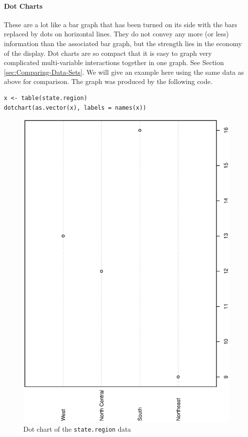 \documentclass[captions=tableheading]{scrbook}
\begin{document}
\paragraph*{Dot Charts}
\label{par:Dotcharts}

These are a lot like a bar graph that has been turned on its side with the bars replaced by dots on horizontal lines. They do not convey any more (or less) information than the associated bar graph, but the strength lies in the economy of the display. Dot charts are so compact that it is easy to graph very complicated multi-variable interactions together in one graph. See Section \ref{sec:Comparing-Data-Sets}. We will give an example here using the same data as above for comparison. The graph was produced by the following code.

\begin{example}


\begin{verbatim}
x <- table(state.region)
dotchart(as.vector(x), labels = names(x))
\end{verbatim}





\begin{figure}[th]
  \includegraphics[angle=270, totalheight=4in]{ps/dot-charts.ps}
  \caption{Dot chart of the \texttt{state.region} data}
  \label{fig:dot-charts}
\end{figure}


\end{example}
\end{document}

